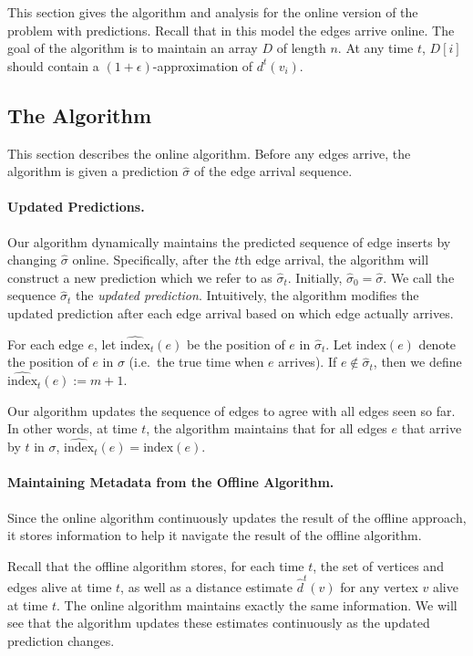 \documentclass[11pt]{article}
\newcommand{\defn}{\emph}
\newcommand{\pred}{\hat{\sigma}}
\newcommand{\ind}{\text{index}}
\begin{document}
This section gives the algorithm and analysis for the online version of the problem with predictions. Recall that in this model the edges arrive online.  The goal of the algorithm is to maintain an array $D$ of length $n$.  At any time $t$, $D[i]$ should contain a $(1 + \epsilon)$-approximation of $d^t(v_i)$.

\subsection{The Algorithm}
This section describes the online algorithm. Before any edges arrive, the algorithm is given a prediction $\hat{\sigma}$ of the edge arrival sequence.  

\paragraph{Updated Predictions.}
Our algorithm dynamically maintains the predicted sequence of edge inserts by changing $\hat{\sigma}$ online.  Specifically, after the $t$th edge arrival, the algorithm will construct a new prediction which we refer to as $\hat{\sigma}_t$.  Initially,  $\hat{\sigma}_0 = \hat{\sigma}$. We call the sequence  $\hat{\sigma}_t$ the \defn{updated prediction}. 
Intuitively, the algorithm modifies the updated prediction after each edge arrival based on which edge actually arrives. 
 
For each edge $e$, let $\widehat{\ind}_t(e)$ be the position of $e$ in $\pred_t$.  Let $\ind(e)$ denote the position of $e$ in $\sigma$ (i.e.\ the true time when $e$ arrives). If $e \notin \pred_t$, then we define $\widehat{\ind}_t(e) := m+1$. 

Our algorithm updates the sequence of edges to agree with all edges seen so far.  In other words, at time $t$, the algorithm maintains that for all edges $e$ that arrive by $t$ in $\sigma$, $\widehat{\ind}_{t}(e) = \ind(e)$.

\paragraph{Maintaining Metadata from the Offline Algorithm.}
Since the online algorithm continuously updates the result of the offline approach, it stores information to help it navigate the result of the offline algorithm.

Recall that the offline algorithm stores, for each time $t$, the set of vertices and edges alive at time $t$, as well as a distance estimate $\hat{d}^{t}(v)$ for any vertex $v$ alive at time $t$.  
The online algorithm maintains exactly the same information.  
We will see that the algorithm updates these estimates continuously as the updated prediction changes.
\end{document}
